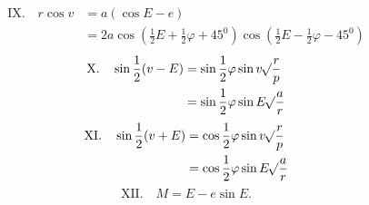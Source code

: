 \[
\begin{aligned}
\mathrm{IX.}\quad r\cos v&=a(\cos E-e)\\
&=2a\cos(\frac{1}{2}E+\frac{1}{2}\varphi+45^0)\cos(\frac{1}{2}E-\frac{1}{2}\varphi-45^0)
\end{aligned}
\]
\[
\begin{aligned}
\mathrm{X.}\quad\sin\frac{1}{2}(v-E)&=\sin\frac{1}{2}\varphi\sin v\mathord{{}^{}\!\surd}\frac{r}{p}\\
&=\sin\frac{1}{2}\varphi\sin E\mathord{{}^{}\!\surd}\frac{a}{r}
\end{aligned}
\]
\[
\begin{aligned}
\mathrm{XI.}\quad\sin\frac{1}{2}(v+E)&=\cos\frac{1}{2}\varphi\sin v\mathord{{}^{}\!\surd}\frac{r}{p}\\
&=\cos\frac{1}{2}\varphi\sin E\mathord{{}^{}\!\surd}\frac{a}{r}
\end{aligned}
\]
\[
\mathrm{XII.}\quad M=E-e\sin E.
\]

